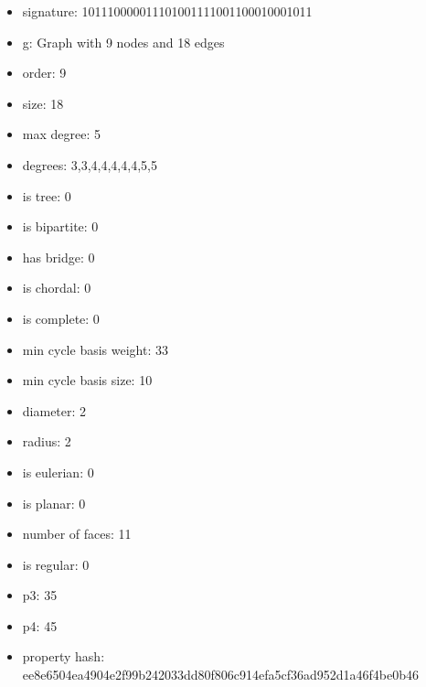 \newpage
\begin{figure}
\end{figure}
\begin{itemize}
\item signature: 101110000011101001111001100010001011
\item g: Graph with 9 nodes and 18 edges
\item order: 9
\item size: 18
\item max degree: 5
\item degrees: 3,3,4,4,4,4,4,5,5
\item is tree: 0
\item is bipartite: 0
\item has bridge: 0
\item is chordal: 0
\item is complete: 0
\item min cycle basis weight: 33
\item min cycle basis size: 10
\item diameter: 2
\item radius: 2
\item is eulerian: 0
\item is planar: 0
\item number of faces: 11
\item is regular: 0
\item p3: 35
\item p4: 45
\item property hash: ee8e6504ea4904e2f99b242033dd80f806c914efa5cf36ad952d1a46f4be0b46
\end{itemize}
